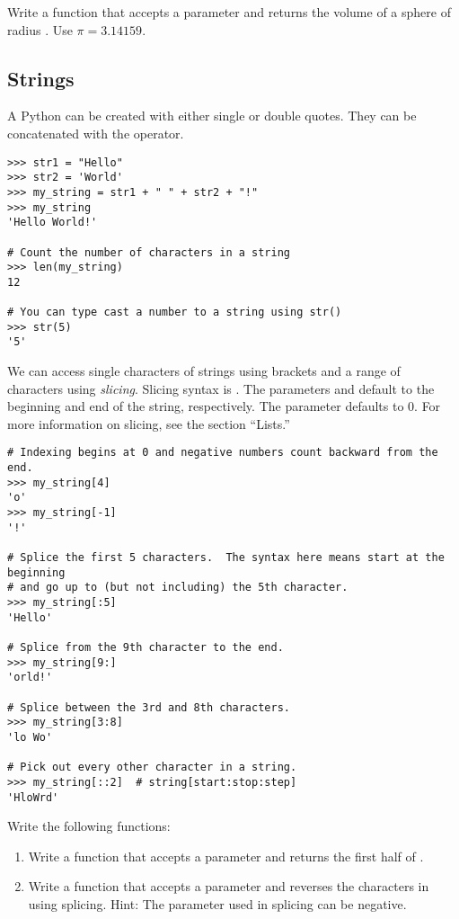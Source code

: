 \begin{problem}
Write a function  that accepts a parameter  and returns the volume of a sphere of radius . Use $\pi=3.14159$.
\end{problem}


\subsection*{Strings}
A Python  can be created with either single or double quotes. They can be concatenated with the \li{+} operator.
\begin{lstlisting}
>>> str1 = "Hello"
>>> str2 = 'World'
>>> my_string = str1 + " " + str2 + "!"
>>> my_string
'Hello World!'

# Count the number of characters in a string
>>> len(my_string)
12

# You can type cast a number to a string using str()
>>> str(5)
'5'
\end{lstlisting}

We can access single characters of strings using brackets and a range of characters using \emph{slicing}. Slicing syntax is . The parameters  and  default to the beginning and end of the string, respectively. The parameter  defaults to 0. For more information on slicing, see the section ``Lists.''

\begin{lstlisting}
# Indexing begins at 0 and negative numbers count backward from the end.
>>> my_string[4]
'o'
>>> my_string[-1]
'!'

# Splice the first 5 characters.  The syntax here means start at the beginning
# and go up to (but not including) the 5th character.
>>> my_string[:5]
'Hello'

# Splice from the 9th character to the end.
>>> my_string[9:]
'orld!'

# Splice between the 3rd and 8th characters.
>>> my_string[3:8]
'lo Wo'

# Pick out every other character in a string.
>>> my_string[::2]	# string[start:stop:step]
'HloWrd'
\end{lstlisting}

\begin{problem}
Write the following functions:
\begin{enumerate}
\item Write a function  that accepts a parameter  and returns the first half of .
\item Write a function  that accepts a parameter  and reverses the characters in  using splicing.  Hint: The  parameter used in splicing can be negative.
\end{enumerate}
\end{problem}


